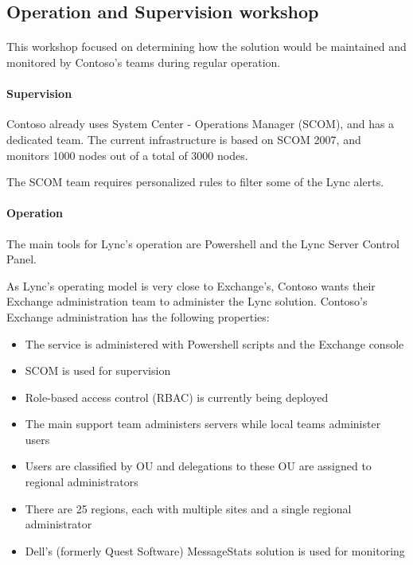 \subsection{Operation and Supervision workshop}
	\paragraph{}
		This workshop focused on determining how the solution would be maintained and monitored by Contoso's teams during regular operation.

	\paragraph{Supervision}
		Contoso already uses System Center - Operations Manager (SCOM), and has a dedicated team. The current infrastructure is based on SCOM 2007, and monitors 1000 nodes out of a total of 3000 nodes.

		The SCOM team requires personalized rules to filter some of the Lync alerts.

	\paragraph{Operation}
		The main tools for Lync's operation are Powershell and the Lync Server Control Panel.

		As Lync's operating model is very close to Exchange's, Contoso wants their Exchange administration team to administer the Lync solution. Contoso's Exchange administration has the following properties:
		\begin{itemize}
			\item The service is administered with Powershell scripts and the Exchange console
			\item SCOM is used for supervision
			\item Role-based access control (RBAC) is currently being deployed
			\item The main support team administers servers while local teams administer users
			\item Users are classified by OU and delegations to these OU are assigned to regional administrators
			\item There are 25 regions, each with multiple sites and a single regional administrator
			\item Dell's (formerly Quest Software) MessageStats solution is used for monitoring
		\end{itemize}

